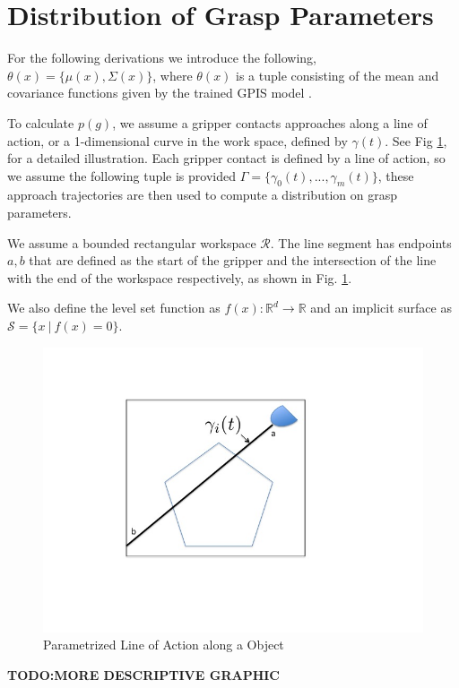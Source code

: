 \documentclass[letterpaper, 10 pt, conference]{ieeeconf}  %
\begin{document}
\section{Distribution of Grasp Parameters}
\label{sec:distgrasp}

 For the following derivations we introduce the following,
 $\theta(x) = \lbrace \mu(x),\Sigma(x) \rbrace$, where $\theta(x)$ is a tuple consisting of the mean and covariance functions given by the trained GPIS model \cite{rasmussen2006} . 
 
 To calculate $p(g)$, we assume a gripper contacts approaches along a line of action, or a 1-dimensional curve in the work space, defined by $\gamma(t)$. See Fig \ref{fig:line_of_action}, for a detailed illustration. Each gripper contact is defined by a line of action, so we assume the following tuple is provided $\Gamma = \lbrace \gamma_0(t),...,\gamma_m(t) \rbrace$, these approach trajectories are then used to compute a distribution on grasp parameters. 
 


We assume a bounded rectangular workspace $\mathcal{R}$.
The line segment has endpoints $a,b$ that are defined as the start of the gripper and the intersection of the line with the end of the workspace respectively, as shown in Fig. 
 \ref{fig:line_of_action}.

 We also define the  level set function as $f(x): \mathbb{R}^d \rightarrow \mathbb{R}$ and an implicit surface as $\mathcal{S} = \{ x \ | \ f(x) = 0 \}$.


\begin{figure}[ht!]
\centering
\includegraphics[scale = 0.3]{figures/Slide1.jpg}
\caption{Parametrized Line of Action along a Object}
\vspace*{-10pt}
\label{fig:line_of_action}
\end{figure}
\textbf{TODO:MORE DESCRIPTIVE GRAPHIC}
\end{document}
